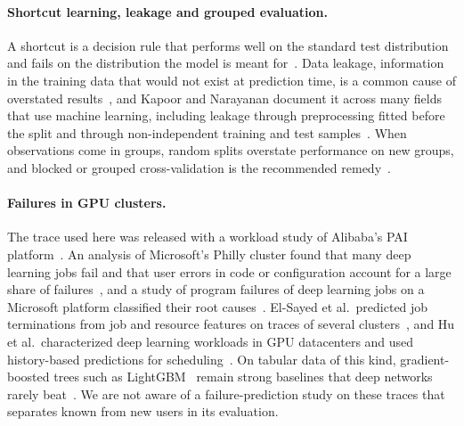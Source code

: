 \paragraph{Shortcut learning, leakage and grouped evaluation.}
A shortcut is a decision rule that performs well on the standard test distribution and fails on the distribution the model is meant for~\cite{geirhos2020shortcut}. Data leakage, information in the training data that would not exist at prediction time, is a common cause of overstated results~\cite{kaufman2012leakage}, and Kapoor and Narayanan document it across many fields that use machine learning, including leakage through preprocessing fitted before the split and through non-independent training and test samples~\cite{kapoor2023leakage}. When observations come in groups, random splits overstate performance on new groups, and blocked or grouped cross-validation is the recommended remedy~\cite{roberts2017cv}.

\paragraph{Failures in GPU clusters.}
The trace used here was released with a workload study of Alibaba's PAI platform~\cite{weng2022mlaas}. An analysis of Microsoft's Philly cluster found that many deep learning jobs fail and that user errors in code or configuration account for a large share of failures~\cite{jeon2019philly}, and a study of program failures of deep learning jobs on a Microsoft platform classified their root causes~\cite{zhang2020dlfailures}. El-Sayed et al.\ predicted job terminations from job and resource features on traces of several clusters~\cite{elsayed2017failure}, and Hu et al.\ characterized deep learning workloads in GPU datacenters and used history-based predictions for scheduling~\cite{hu2021helios}. On tabular data of this kind, gradient-boosted trees such as LightGBM~\cite{ke2017lightgbm} remain strong baselines that deep networks rarely beat~\cite{grinsztajn2022tree}. We are not aware of a failure-prediction study on these traces that separates known from new users in its evaluation.
